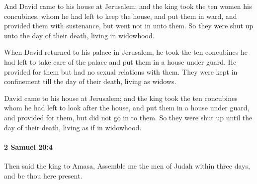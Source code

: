 			\begin{versebox}
					\item[BHS] 
					\item[ASV] And David came to his house at Jerusalem; and the king took the ten women his concubines, whom he had left to keep the house, and put them in ward, and provided them with sustenance, but went not in unto them. So they were shut up unto the day of their death, living in widowhood.
					\item[NIV] When David returned to his palace in Jerusalem, he took the ten concubines he had left to take care of the palace and put them in a house under guard. He provided for them but had no sexual relations with them. They were kept in confinement till the day of their death, living as widows.
					\item[NRSV] David came to his house at Jerusalem; and the king took the ten concubines whom he had left to look after the house, and put them in a house under guard, and provided for them, but did not go in to them. So they were shut up until the day of their death, living as if in widowhood.
			\end{versebox}

		\paragraph{2 Samuel 20:4} %
			\label{2SAMUEL-20-4}

			Then said the king to Amasa, Assemble me the men of Judah within three days, and be thou here present.

